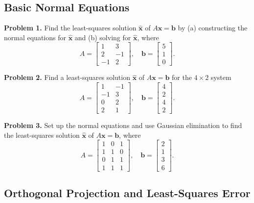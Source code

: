 \documentclass[11pt, letterpaper]{article}
\theoremstyle{definition}
\theoremstyle{remark}
\begin{document}
\subsection{Basic Normal Equations}

\textbf{Problem 1.} Find the least-squares solution $\hat{\mathbf{x}}$ of $A\mathbf{x} = \mathbf{b}$ by (a) constructing the normal equations for $\hat{\mathbf{x}}$ and (b) solving for $\hat{\mathbf{x}}$, where
\[
A = \begin{bmatrix} 1 & 3 \\ 2 & -1 \\ -1 & 2 \end{bmatrix}, \quad \mathbf{b} = \begin{bmatrix} 5 \\ 1 \\ 0 \end{bmatrix}.
\]

\textbf{Problem 2.} Find a least-squares solution $\hat{\mathbf{x}}$ of $A\mathbf{x} = \mathbf{b}$ for the $4 \times 2$ system
\[
A = \begin{bmatrix} 1 & -1 \\ -1 & 3 \\ 0 & 2 \\ 2 & 1 \end{bmatrix}, \quad \mathbf{b} = \begin{bmatrix} 4 \\ 2 \\ 4 \\ 2 \end{bmatrix}.
\]

\textbf{Problem 3.} Set up the normal equations and use Gaussian elimination to find the least-squares solution $\hat{\mathbf{x}}$ of $A\mathbf{x} = \mathbf{b}$, where
\[
A = \begin{bmatrix} 1 & 0 & 1 \\ 1 & 1 & 0 \\ 0 & 1 & 1 \\ 1 & 1 & 1 \end{bmatrix}, \quad \mathbf{b} = \begin{bmatrix} 2 \\ 1 \\ 3 \\ 6 \end{bmatrix}.
\]

\subsection{Orthogonal Projection and Least-Squares Error}
\end{document}
